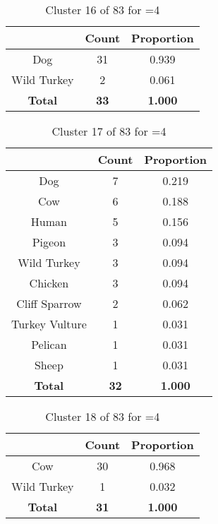 \begin{table}[ht!]
\centering
\begin{tabular}{|c|c|c|}
\hline
\bf \Spec{} &\bf Count &\bf Proportion\\ \hline \hline
Dog & 31 & 0.939\\ \hline
Wild Turkey & 2 & 0.061\\ \hline
\hline
\bf Total & \bf 33 & \bf 1.000\\ \hline
\end{tabular}
\label{tab:cluster:16:4}
\caption{Cluster 16 of 83 for \minneigh{}=4}
\end{table}

\begin{table}[ht!]
\centering
\begin{tabular}{|c|c|c|}
\hline
\bf \Spec{} &\bf Count &\bf Proportion\\ \hline \hline
Dog & 7 & 0.219\\ \hline
Cow & 6 & 0.188\\ \hline
Human & 5 & 0.156\\ \hline
Pigeon & 3 & 0.094\\ \hline
Wild Turkey & 3 & 0.094\\ \hline
Chicken & 3 & 0.094\\ \hline
Cliff Sparrow & 2 & 0.062\\ \hline
Turkey Vulture & 1 & 0.031\\ \hline
Pelican & 1 & 0.031\\ \hline
Sheep & 1 & 0.031\\ \hline
\hline
\bf Total & \bf 32 & \bf 1.000\\ \hline
\end{tabular}
\label{tab:cluster:17:4}
\caption{Cluster 17 of 83 for \minneigh{}=4}
\end{table}

\begin{table}[ht!]
\centering
\begin{tabular}{|c|c|c|}
\hline
\bf \Spec{} &\bf Count &\bf Proportion\\ \hline \hline
Cow & 30 & 0.968\\ \hline
Wild Turkey & 1 & 0.032\\ \hline
\hline
\bf Total & \bf 31 & \bf 1.000\\ \hline
\end{tabular}
\label{tab:cluster:18:4}
\caption{Cluster 18 of 83 for \minneigh{}=4}
\end{table}

